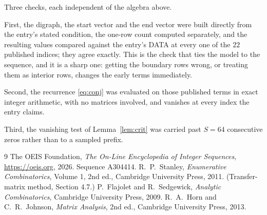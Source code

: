 \documentclass[11pt,a4paper]{article}
\theoremstyle{plain}
\theoremstyle{definition}
\begin{document}
Three checks, each independent of the algebra above.

First, the digraph, the start vector and the end vector were built directly from the
entry's stated condition, the one-row count computed separately, and the resulting values
compared against the entry's DATA at every one of the $22$ published indices; they
agree exactly. This is the check that ties the model to the sequence, and it is a sharp one:
getting the boundary rows wrong, or treating them as interior rows, changes the early terms
immediately.

Second, the recurrence \eqref{eq:conj} was evaluated on those published terms in exact
integer arithmetic, with no matrices involved, and vanishes at every index the entry claims.

Third, the vanishing test of Lemma~\ref{lem:crit} was carried past $S=64$ consecutive
zeros rather than to a sampled prefix.

\begin{thebibliography}{9}
 The OEIS Foundation, \emph{The On-Line Encyclopedia of Integer
Sequences}, \url{https://oeis.org}, 2026. Sequence A304414.
 R.~P.~Stanley, \emph{Enumerative Combinatorics}, Volume 1, 2nd ed.,
Cambridge University Press, 2011. (Transfer-matrix method, Section 4.7.)
 P.~Flajolet and R.~Sedgewick, \emph{Analytic Combinatorics}, Cambridge
University Press, 2009.
 R.~A.~Horn and C.~R.~Johnson, \emph{Matrix Analysis}, 2nd ed., Cambridge
University Press, 2013.
\end{thebibliography}
\end{document}

